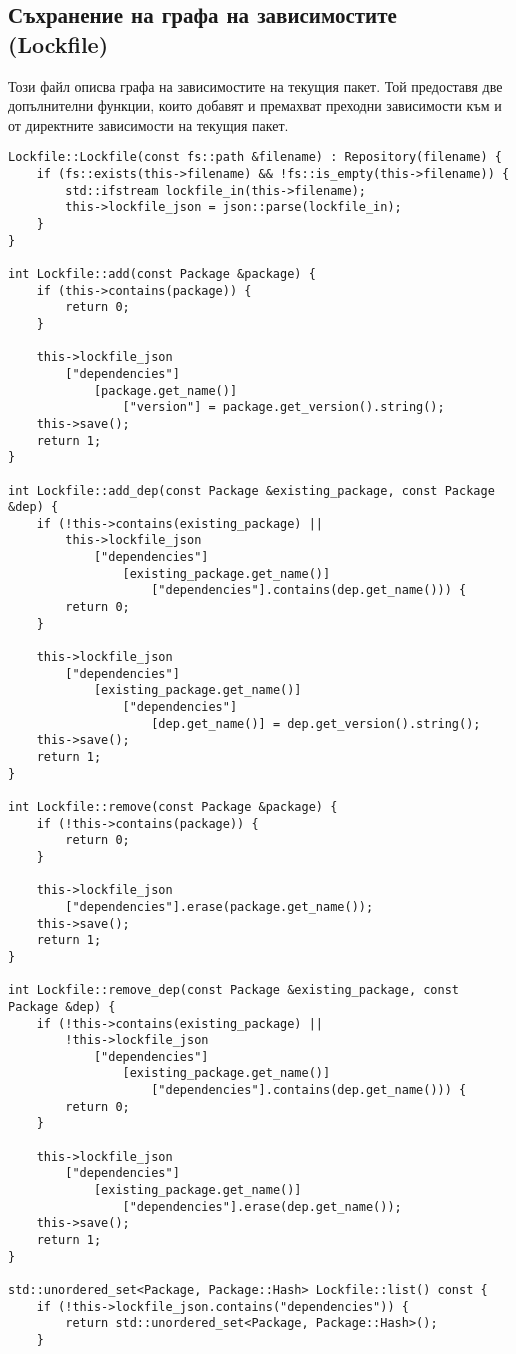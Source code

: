 \subsection{Съхранение на графа на зависимостите \\ (Lockfile)}

Този файл описва графа на зависимостите на текущия пакет. Той предоставя две
допълнителни функции, които добавят и премахват преходни зависимости към и от
директните зависимости на текущия пакет.

\begin{lstlisting}[style=cpp,
				   caption={Файл, описващ графа на зависимостите на
				   			текущия пакет},
				   label={lst:lockfile}]
Lockfile::Lockfile(const fs::path &filename) : Repository(filename) {
	if (fs::exists(this->filename) && !fs::is_empty(this->filename)) {
		std::ifstream lockfile_in(this->filename);
		this->lockfile_json = json::parse(lockfile_in);
	}
}

int Lockfile::add(const Package &package) {
	if (this->contains(package)) {
		return 0;
	}

	this->lockfile_json
		["dependencies"]
			[package.get_name()]
				["version"] = package.get_version().string();
	this->save();
	return 1;
}

int Lockfile::add_dep(const Package &existing_package, const Package &dep) {
	if (!this->contains(existing_package) ||
		this->lockfile_json
			["dependencies"]
				[existing_package.get_name()]
					["dependencies"].contains(dep.get_name())) {
		return 0;
	}

	this->lockfile_json
		["dependencies"]
			[existing_package.get_name()]
				["dependencies"]
					[dep.get_name()] = dep.get_version().string();
	this->save();
	return 1;
}

int Lockfile::remove(const Package &package) {
	if (!this->contains(package)) {
		return 0;
	}

	this->lockfile_json
		["dependencies"].erase(package.get_name());
	this->save();
	return 1;
}

int Lockfile::remove_dep(const Package &existing_package, const Package &dep) {
	if (!this->contains(existing_package) ||
		!this->lockfile_json
			["dependencies"]
				[existing_package.get_name()]
					["dependencies"].contains(dep.get_name())) {
		return 0;
	}

	this->lockfile_json
		["dependencies"]
			[existing_package.get_name()]
				["dependencies"].erase(dep.get_name());
	this->save();
	return 1;
}

std::unordered_set<Package, Package::Hash> Lockfile::list() const {
	if (!this->lockfile_json.contains("dependencies")) {
		return std::unordered_set<Package, Package::Hash>();
	}


\end{lstlisting}

